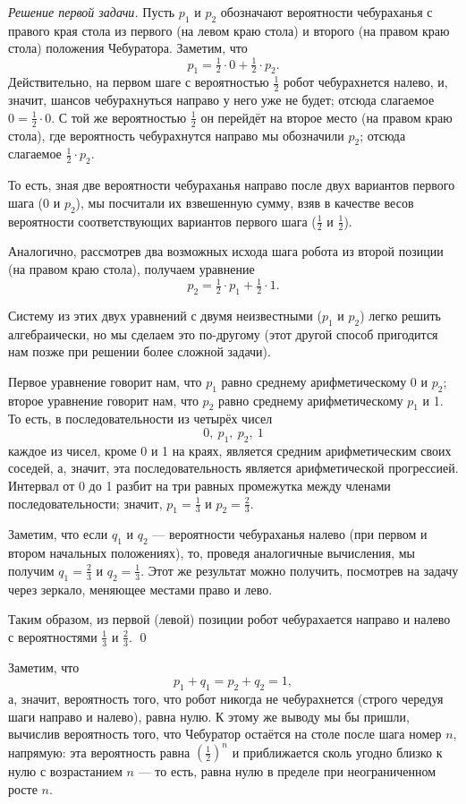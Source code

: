 \documentclass{article}
\begin{document}
\medskip
\noindent\textit{Решение первой задачи.}
Пусть $p_1$ и $p_2$ обозначают вероятности чебураханья с правого края стола из первого (на левом краю стола) и второго (на правом краю стола) положения Чебуратора.
Заметим, что
\[p_1=\tfrac12\cdot0+\tfrac12\cdot p_2.\]
Действительно, на первом шаге с вероятностью $\tfrac12$ робот чебурахнется налево,
и, значит, шансов чебурахнуться направо у него уже не будет; 
отсюда слагаемое $0=\tfrac12\cdot0$. 
С той же вероятностью $\tfrac12$ он перейдёт на второе место (на правом краю стола), где вероятность чебурахнутся направо мы обозначили $p_2$; отсюда слагаемое $\tfrac12\cdot p_2$. 

То есть, зная две вероятности чебураханья направо после двух вариантов первого шага (0 и $p_2$), мы посчитали их взвешенную сумму, взяв в качестве весов вероятности соответствующих вариантов первого шага ($\tfrac12$ и $\tfrac12$).

Аналогично, рассмотрев два возможных исхода шага робота из второй позиции (на правом краю стола), получаем уравнение 
\[p_2=\tfrac12\cdot p_1+\tfrac12\cdot 1.\]

Систему из этих двух уравнений с двумя неизвестными ($p_1$ и $p_2$) легко решить алгебраически, но мы сделаем это по-другому (этот другой способ пригодится нам позже при решении более сложной задачи). 

Первое уравнение говорит нам, что $p_1$ равно среднему арифметическому 0 и $p_2$; второе уравнение говорит нам, что $p_2$ равно среднему арифметическому $p_1$ и 1. То есть, в последовательности из четырёх чисел
\[0,\  p_1,\  p_2,\ 1\]
каждое из чисел, кроме 0 и 1 на краях, является средним арифметическим своих соседей, а, значит, эта последовательность является арифметической прогрессией. 
Интервал от 0 до 1 разбит на три равных промежутка между членами последовательности; значит, $p_1=\tfrac13$ и $p_2=\tfrac23$.

Заметим, что если $q_1$ и $q_2$ --- вероятности чебураханья налево (при первом и втором начальных положениях), 
то, проведя аналогичные вычисления, мы получим $q_1=\tfrac23$ и $q_2=\tfrac13$.
Этот же результат можно получить, посмотрев на задачу через зеркало, меняющее местами право и лево.

Таким образом, из первой (левой) позиции робот чебурахается направо и налево с вероятностями $\tfrac13$ и $\tfrac23$.
\qed
\medskip

Заметим, что 
\[p_1+q_1=p_2+q_2=1,\]
а, значит, вероятность того, что робот никогда не чебурахнется (строго чередуя шаги направо и налево), равна нулю. 
К этому же выводу мы бы пришли, вычислив вероятность того, что Чебуратор остаётся на столе после шага номер $n$, напрямую: эта вероятность равна $(\tfrac12)^n$ и приближается сколь угодно близко к нулю с возрастанием $n$ --- то есть, равна нулю в пределе при неограниченном росте $n$.
\medskip
\end{document}
